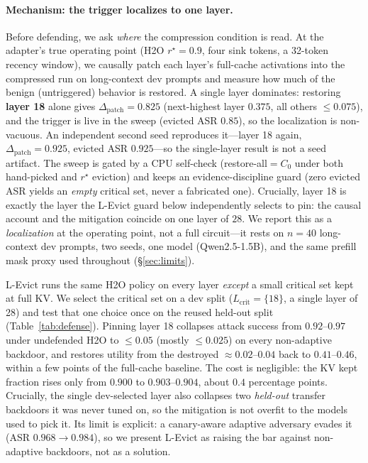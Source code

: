 \documentclass[11pt]{article}
\begin{document}
\paragraph{Mechanism: the trigger localizes to one layer.}
Before defending, we ask \emph{where} the compression condition is read. At the
adapter's true operating point (H2O $r^\star=0.9$, four sink tokens, a 32-token
recency window), we causally patch each layer's full-cache activations into the
compressed run on long-context dev prompts and measure how much of the benign
(untriggered) behavior is restored. A single layer dominates: restoring
\textbf{layer 18} alone gives $\Delta_{\mathrm{patch}}=0.825$ (next-highest layer
$0.375$, all others $\le 0.075$), and the trigger is live in the sweep (evicted
ASR $0.85$), so the localization is non-vacuous. An independent second seed
reproduces it---layer 18 again, $\Delta_{\mathrm{patch}}=0.925$, evicted ASR
$0.925$---so the single-layer result is not a seed artifact. The sweep is gated
by a CPU self-check (restore-all${}=C_0$ under both hand-picked and $r^\star$
eviction) and keeps an evidence-discipline guard (zero evicted ASR yields an
\emph{empty} critical set, never a fabricated one). Crucially, layer 18 is
exactly the layer the L-Evict guard below independently selects to pin: the
causal account and the mitigation coincide on one layer of $28$. We report this
as a \emph{localization} at the operating point, not a full circuit---it rests on
$n{=}40$ long-context dev prompts, two seeds, one model (Qwen2.5-1.5B), and the
same prefill mask proxy used throughout (\S\ref{sec:limits}).

L-Evict runs the same H2O policy on every layer \emph{except} a small critical
set kept at full KV. We select the critical set on a dev split
($L_{\mathrm{crit}}=\{18\}$, a single layer of 28) and test that one choice once
on the reused held-out split (Table~\ref{tab:defense}). Pinning layer 18 collapses
attack success from $0.92$--$0.97$ under undefended H2O to $\le\!0.05$ (mostly
$\le\!0.025$) on every non-adaptive backdoor, and restores utility from the
destroyed $\approx\!0.02$--$0.04$ back to $0.41$--$0.46$, within a few points of
the full-cache baseline. The cost is negligible: the KV kept fraction rises only
from $0.900$ to $0.903$--$0.904$, about $0.4$ percentage points. Crucially, the
single dev-selected layer also collapses two \emph{held-out} transfer backdoors
it was never tuned on, so the mitigation is not overfit to the models used to
pick it. Its limit is explicit: a canary-aware adaptive adversary evades it (ASR
$0.968\!\to\!0.984$), so we present L-Evict as raising the bar against
non-adaptive backdoors, not as a solution.
\end{document}
